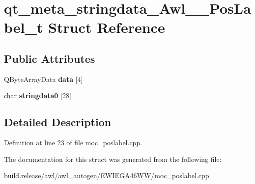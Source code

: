 \hypertarget{structqt__meta__stringdata___awl_____pos_label__t}{}\section{qt\+\_\+meta\+\_\+stringdata\+\_\+\+Awl\+\_\+\+\_\+\+Pos\+Label\+\_\+t Struct Reference}
\label{structqt__meta__stringdata___awl_____pos_label__t}
\subsection*{Public Attributes}
\begin{DoxyCompactItemize}
\item 
\mbox{\label{structqt__meta__stringdata___awl_____pos_label__t_a47a8ebb71edb7ff255d4902c4983f478}} 
Q\+Byte\+Array\+Data {\bfseries data} \mbox{[}4\mbox{]}
\item 
\mbox{\label{structqt__meta__stringdata___awl_____pos_label__t_a9d0d5e5023bd20a7c440badd6f99c633}} 
char {\bfseries stringdata0} \mbox{[}28\mbox{]}
\end{DoxyCompactItemize}


\subsection{Detailed Description}


Definition at line 23 of file moc\+\_\+poslabel.\+cpp.



The documentation for this struct was generated from the following file\+:\begin{DoxyCompactItemize}
\item 
build.\+release/awl/awl\+\_\+autogen/\+E\+W\+I\+E\+G\+A46\+W\+W/moc\+\_\+poslabel.\+cpp\end{DoxyCompactItemize}
